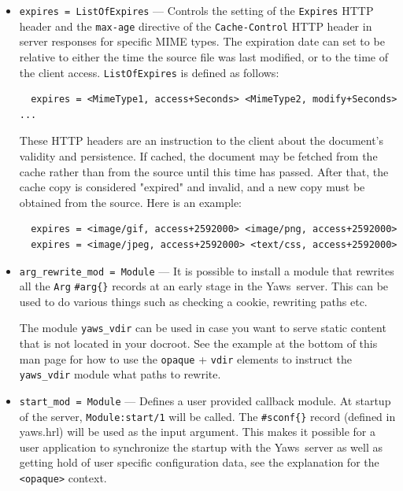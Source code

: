 \documentclass[11pt,oneside,english]{book}
\newcommand{\Yaws}            %
        {{\sc Yaws}}
\begin{document}
\begin{itemize}
\item       \verb+expires = ListOfExpires+ ---
              Controls the setting of the \verb+Expires+ HTTP header and the
              \verb+max-age+ directive of the \verb+Cache-Control+ HTTP header
              in server responses for specific MIME types. The expiration date
              can set to be relative to either the time the source file was last
              modified, or to the time of the client
              access. \verb+ListOfExpires+ is defined as follows:
\begin{verbatim}
  expires = <MimeType1, access+Seconds> <MimeType2, modify+Seconds> ...
\end{verbatim}
              These HTTP headers are an instruction to the client about the
              document's validity and persistence. If cached, the document may
              be fetched from the cache rather than from the source until this
              time has passed. After that, the cache copy is considered
              "expired" and invalid, and a new copy must be obtained from the
              source.
              Here is an example:
\begin{verbatim}
  expires = <image/gif, access+2592000> <image/png, access+2592000>
  expires = <image/jpeg, access+2592000> <text/css, access+2592000>
\end{verbatim}

\item       \verb+arg_rewrite_mod = Module+ ---
              It is possible to install a module that rewrites all the
              \verb+Arg+ \verb+#arg{}+ records at an early stage in the
              \Yaws\ server.  This can be used to do various things such as
              checking a cookie, rewriting paths etc.

              The module \verb+yaws_vdir+ can be used in case you want to serve
              static content that is not located in your docroot. See the
              example at the bottom of this man page for how to use the
              \verb+opaque+ + \verb+vdir+ elements to instruct the
              \verb+yaws_vdir+ module what paths to rewrite.

\item       \verb+start_mod = Module+ ---
              Defines a user provided callback module. At startup of the server,
              \verb+Module:start/1+ will be called.  The \verb+#sconf{}+ record
              (defined in yaws.hrl) will be used as the input argument. This
              makes it possible for a user application to synchronize the
              startup with the \Yaws\ server as well as getting hold of user
              specific configuration data, see the explanation for the
              \verb+<opaque>+ context.


\end{itemize}
\end{document}
